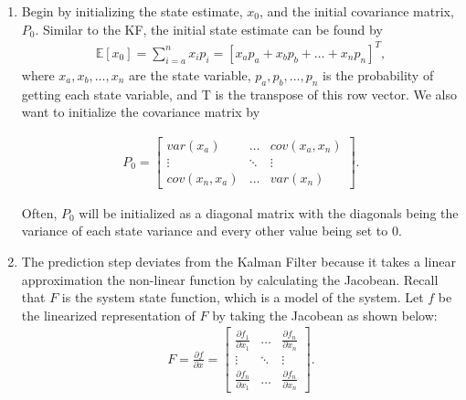 \begin{enumerate}
  \item Begin by initializing the state estimate, $x_0$, and the initial covariance matrix, $P_0$. Similar to the KF, the initial state estimate can be found by 
  \begin{align*}
           \mathbb{E}[x_0]   = \sum^n_{i = a} x_i p_i = [x_a p_a + x_b p_b + \hdots + x_n p_n]^T,
      \end{align*}
 \noindent where  $x_a, x_b, \hdots, x_n$ are the state variable, $p_a, p_b, \hdots, p_n$ is the probability of getting each state variable, and T is the transpose of this row vector. We also want to initialize the covariance matrix by

    
  \begin{align*}
      P_0 =
      \begin{bmatrix}
           var(x_a)  & \hdots & cov(x_a,x_n) \\
           \vdots & \ddots & \vdots \\
           cov(x_n, x_a)  & \hdots & var(x_n )
         \end{bmatrix} .
  \end{align*}  
  
  Often, $P_0 $ will be initialized as a diagonal matrix with the diagonals being the variance of each state variance and every other value being set to 0.
  
  
  \item The prediction step deviates from the Kalman Filter because it takes a linear approximation the non-linear function by calculating the Jacobean. Recall that $F$ is the system state function, which is a model of the system. Let $f$ be the linearized representation of $F$ by taking the Jacobean as shown below:
  \begin{align*}
      F= \frac{\partial f}{\partial x} =
      \begin{bmatrix}
           \frac{\partial f_1}{\partial x_1} & \hdots & \frac{\partial f_n}{\partial x_n} \\
           \vdots & \ddots & \vdots \\
           \frac{\partial f_n}{\partial x_1}  & \hdots & \frac{\partial f_n}{\partial x_n}
         \end{bmatrix}  .
  \end{align*}
  

\end{enumerate}
